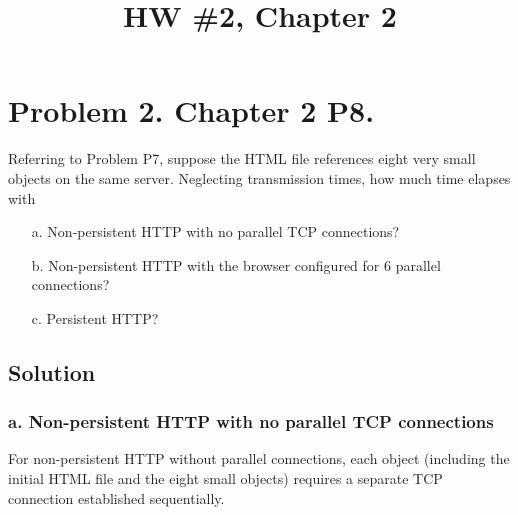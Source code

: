 \documentclass{cshwk}
\begin{document}
\title{HW \#2, Chapter 2}

\maketitle

\section*{Problem 2. Chapter 2 P8.}
Referring to Problem P7, suppose the HTML file references eight very small objects on the same server. Neglecting transmission times, how much time elapses with
\begin{itemize}
    \item[a.] Non-persistent HTTP with no parallel TCP connections?
    \item[b.] Non-persistent HTTP with the browser configured for 6 parallel connections?
    \item[c.] Persistent HTTP?
\end{itemize}

\subsection*{Solution}

    \subsubsection*{a. Non-persistent HTTP with no parallel TCP connections}

    For non-persistent HTTP without parallel connections, each object (including the initial HTML file and the eight small objects) requires a separate TCP connection established sequentially.
\end{document}
